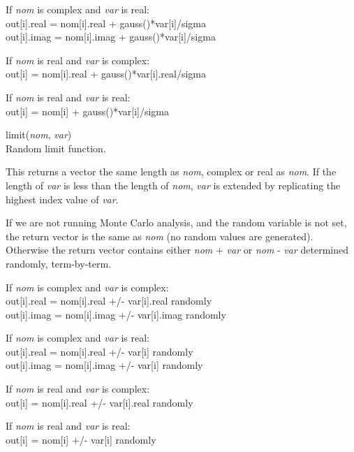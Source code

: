 \begin{description}
\begin{description}
\item{If {\it nom} is complex and {\it var} is real:}\\
  {\vt out[i].real = nom[i].real + gauss()*var[i]/sigma}\\
  {\vt out[i].imag = nom[i].imag + gauss()*var[i]/sigma}

\item{If {\it nom} is real and {\it var} is complex:}\\
  {\vt out[i] = nom[i].real + gauss()*var[i].real/sigma}

\item{If {\it nom} is real and {\it var} is real:}\\
  {\vt out[i] = nom[i] + gauss()*var[i]/sigma}
\end{description}

\item{\vt limit}({\it nom\/}, {\it var\/})\\
Random limit function.

This returns a vector the same length as {\it nom\/}, complex or real
as {\it nom\/}.  If the length of {\it var} is less than the length of
{\it nom\/}, {\it var} is extended by replicating the highest index
value of {\it var\/}.

If we are not running Monte Carlo analysis, and the {\et random}
variable is not set, the return vector is the same as {\it nom} (no
random values are generated).  Otherwise the return vector contains
either {\it nom} + {\it var} or {\it nom} - {\it var} determined
randomly, term-by-term.

\begin{description}
\item{If {\it nom} is complex and {\it var} is complex:}\\
  {\vt out[i].real = nom[i].real +/- var[i].real} randomly\\
  {\vt out[i].imag = nom[i].imag +/- var[i].imag} randomly

\item{If {\it nom} is complex and {\it var} is real:}\\
  {\vt out[i].real = nom[i].real +/- var[i]} randomly\\
  {\vt out[i].imag = nom[i].imag +/- var[i]} randomly

\item{If {\it nom} is real and {\it var} is complex:}\\
  {\vt out[i] = nom[i].real +/- var[i].real} randomly

\item{If {\it nom} is real and {\it var} is real:}\\
  {\vt out[i] = nom[i] +/- var[i]} randomly
\end{description}
\end{description}


